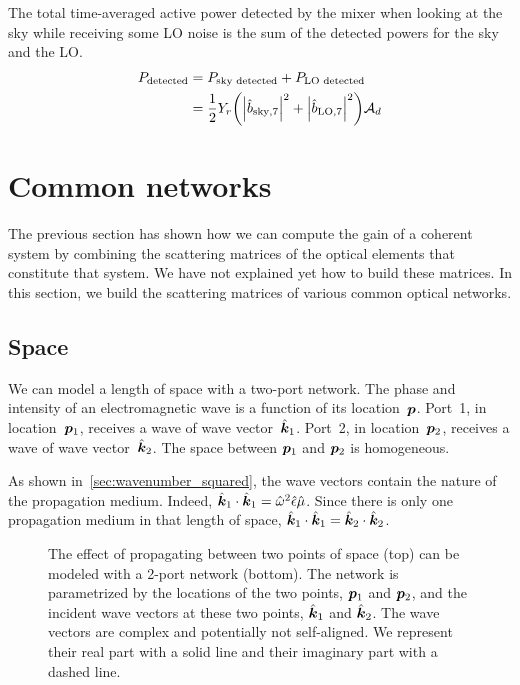 The total time-averaged active power detected by the mixer when looking at the sky while receiving some LO noise is the sum of the detected powers for the sky and the LO.
\begin{align*}
    P_\text{detected}
    &=
    P_\text{sky detected} + P_\text{LO detected}
    \\
    &= \frac{1}{2}
       Y_r
       \left(
           \abs{\cp{b}_{\text{sky},7}}^2
           +
           \abs{\cp{b}_{\text{LO},7}}^2
       \right)
       \mathcal{A}_d
\end{align*}



\FloatBarrier
\section{Common networks}
The previous section has shown how we can compute the gain of a coherent system by combining the scattering matrices of the optical elements that constitute that system.
We have not explained yet how to build these matrices.
In this section, we build the scattering matrices of various common optical networks.



\subsection{Space}
We can model a length of space with a two-port network.
The phase and intensity of an electromagnetic wave is a function of its location~$\bm{p}$.
Port~1, in location~$\bm{p}_1$, receives a wave of wave vector~$\hat{\bm{k}}_1$.
Port~2, in location~$\bm{p}_2$, receives a wave of wave vector~$\hat{\bm{k}}_2$.
The space between $\bm{p}_1$ and $\bm{p}_2$ is homogeneous.

As shown in~\cref{sec:wavenumber_squared}, the wave vectors contain the nature of the propagation medium.
Indeed, $\hat{\bm{k}}_1\cdot\hat{\bm{k}}_1 = \hat{\omega}^2\hat{\epsilon}\hat{\mu}$.
Since there is only one propagation medium in that length of space,
$\hat{\bm{k}}_1\cdot\hat{\bm{k}}_1 = \hat{\bm{k}}_2\cdot\hat{\bm{k}}_2$.

\begin{figure}
    \centering
    
    \caption{The effect of propagating between two points of space (top) can be modeled with a 2-port network (bottom).
        The network is parametrized by the locations of the two points,
        $\bm{p}_1$ and $\bm{p}_2$,
        and the incident wave vectors at these two points,
        $\hat{\bm{k}}_1$ and $\hat{\bm{k}}_2$.
        The wave vectors are complex and potentially not self-aligned.
        We represent their real part with a solid line and their imaginary part with a dashed line.
    }
    \label{fig:network_distance}
\end{figure}

